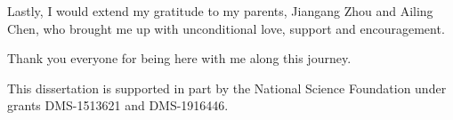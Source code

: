 \begin{acknowledgements}
Lastly, I would extend my gratitude to my parents, Jiangang Zhou and Ailing Chen, who brought me up with unconditional love, support and encouragement. 

Thank you everyone for being here with me along this journey. 

This dissertation is supported in part by the National Science Foundation under grants DMS-1513621 and DMS-1916446. 

\end{acknowledgements}
